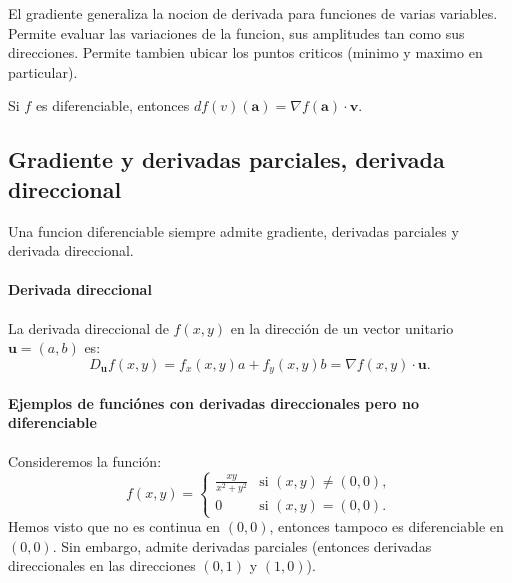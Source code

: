 \documentclass[11pt]{book}
\theoremstyle{definicion}
\theoremstyle{teorema}
\theoremstyle{ejemplo}
\begin{document}

%

\noindent
El gradiente generaliza la nocion de derivada para funciones de varias variables. Permite evaluar las variaciones de la funcion, sus amplitudes tan como sus direcciones. Permite tambien ubicar los puntos criticos (minimo y maximo en particular).

\medskip

\noindent
Si \( f \) es diferenciable, entonces \( df({v})(\mathbf{a}) = \nabla f(\mathbf{a}) \cdot \mathbf{v} \).

\subsection{Gradiente y derivadas parciales, derivada direccional}

\noindent Una funcion diferenciable siempre admite gradiente, derivadas parciales y derivada direccional.

\paragraph{Derivada direccional}
La derivada direccional de \(f(x, y)\) en la dirección de un vector unitario \(\mathbf{u} = (a, b)\) es:
\[ D_{\mathbf{u}} f(x, y) = f_x(x, y) a + f_y(x, y) b = \nabla f(x,y) \cdot \mathbf{u}.\]

\paragraph{Ejemplos de funciónes con derivadas direccionales pero no diferenciable}
Consideremos la función: 
\[ f(x, y) = \begin{cases}
\displaystyle \frac{xy}{x^2 + y^2} & \text{si } (x, y) \neq (0, 0), \\
0 & \text{si } (x, y) = (0, 0).
\end{cases} \]
Hemos visto que no es continua en $(0,0)$, entonces tampoco es diferenciable en $(0,0)$. 
Sin embargo, admite derivadas parciales (entonces derivadas direccionales en las direcciones $(0,1)$ y $(1,0)$).
\end{document}
